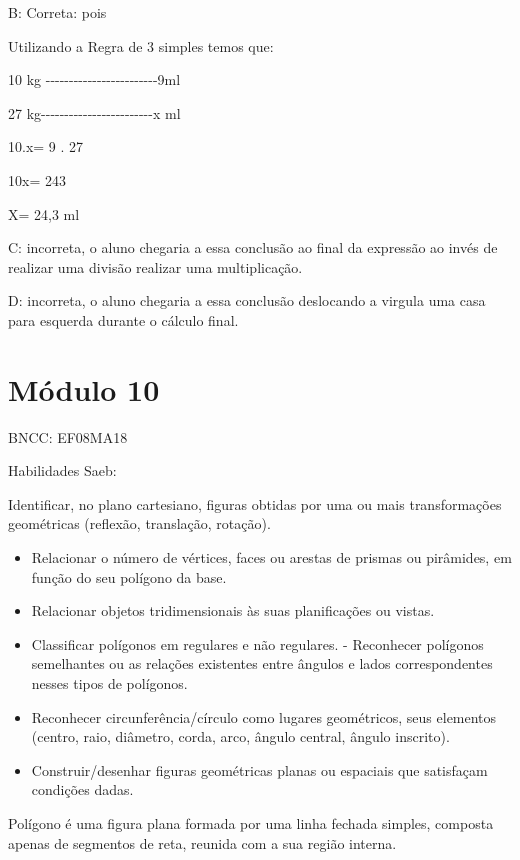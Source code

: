 B: Correta: pois

Utilizando a Regra de 3 simples temos que:

10 kg
-\/-\/-\/-\/-\/-\/-\/-\/-\/-\/-\/-\/-\/-\/-\/-\/-\/-\/-\/-\/-\/-\/-\/-9ml

27
kg-\/-\/-\/-\/-\/-\/-\/-\/-\/-\/-\/-\/-\/-\/-\/-\/-\/-\/-\/-\/-\/-\/-\/-x
ml

10.x= 9 . 27

10x= 243

X= 24,3 ml

C: incorreta, o aluno chegaria a essa conclusão ao final da expressão ao
invés de realizar uma divisão realizar uma multiplicação.

D: incorreta, o aluno chegaria a essa conclusão deslocando a virgula uma
casa para esquerda durante o cálculo final.

\hypertarget{muxf3dulo-10}{%
\section{Módulo 10}\label{muxf3dulo-10}}

BNCC: EF08MA18

Habilidades Saeb:

Identificar, no plano cartesiano, figuras obtidas por uma ou mais
transformações geométricas (reflexão, translação, rotação).

\begin{itemize}
\item
  Relacionar o número de vértices, faces ou arestas de prismas ou
  pirâmides, em função do seu polígono da base.
\item
  Relacionar objetos tridimensionais às suas planificações ou vistas.
\item
  Classificar polígonos em regulares e não regulares. - Reconhecer
  polígonos semelhantes ou as relações existentes entre ângulos e lados
  correspondentes nesses tipos de polígonos.
\item
  Reconhecer circunferência/círculo como lugares geométricos, seus
  elementos (centro, raio, diâmetro, corda, arco, ângulo central, ângulo
  inscrito).
\item
  Construir/desenhar figuras geométricas planas ou espaciais que
  satisfaçam condições dadas.
\end{itemize}

Polígono é uma figura plana formada por uma linha fechada simples,
composta apenas de segmentos de reta, reunida com a sua região interna.

